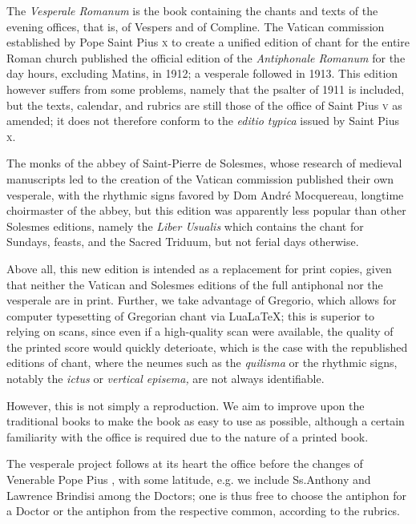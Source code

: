 

\begin{enpars}
The \textit{Vesperale Romanum} is the book containing the chants and texts of the evening offices, that is, of Vespers and of Compline. The Vatican commission established by Pope Saint Pius \textsc{x} to create a unified edition of chant for the entire Roman church published the official edition of the \textit{Antiphonale Romanum} for the day hours, excluding Matins, in 1912; a vesperale followed in 1913. This edition however suffers from some problems, namely that the psalter of 1911 is included, but the texts, calendar, and rubrics are still those of the office of Saint Pius \textsc{v} as amended; it does not therefore conform to the \textit{editio typica} issued by Saint Pius \textsc{x}.

The monks of the abbey of Saint-Pierre de Solesmes, whose research of medieval manuscripts led to the creation of the Vatican commission published their own vesperale, with the rhythmic signs favored by Dom André Mocquereau, longtime choirmaster of the abbey, but this edition was apparently less popular than other Solesmes editions, namely the \textit{Liber Usualis} which contains the chant for Sundays, feasts, and the Sacred Triduum, but not ferial days otherwise.


Above all, this new edition is intended as a replacement for print copies, given that neither the Vatican and Solesmes editions of the full antiphonal nor the vesperale are in print. Further, we take advantage of Gregorio, which allows for computer typesetting of Gregorian chant via LuaLaTeX; this is superior to relying on scans, since even if a high-quality scan were available, the quality of the printed score would quickly deterioate, which is the case with the republished editions of chant, where the neumes such as the \textit{quilisma} or the rhythmic signs, notably the \textit{ictus} or \textit{vertical episema,} are not always identifiable.

However, this is not simply a reproduction. We aim to improve upon the traditional books to make the book as easy to use as possible, although a certain familiarity with the office is required due to the nature of a printed book.


The vesperale project follows at its heart the office before the changes of Venerable Pope Pius , with some latitude, e.g. we include Ss.\@ Anthony and Lawrence Brindisi among the Doctors; one is thus free to choose the antiphon for a Doctor or the antiphon from the respective common, according to the rubrics.


\end{enpars}
